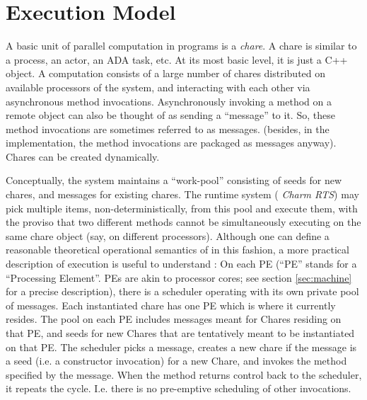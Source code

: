 \section{Execution Model}

A basic
unit of parallel computation in \charm programs is a {\em
chare}. 
A chare is similar to a process, an actor, an ADA task,
etc. At its most basic level, it is just a C++ object.
A \charm computation consists of a large number of chares
distributed on available processors of the system, and interacting
with each other via asynchronous method invocations.
Asynchronously invoking a method on a remote object can also be
thought of as
sending a ``message'' to it. So, these method invocations are
sometimes referred to as messages. (besides, in the implementation,
the method invocations are packaged as messages anyway).
Chares can be
created dynamically.

Conceptually, the system maintains a
``work-pool'' consisting of seeds for new chares, and
messages for existing chares. The \charm runtime system ({\em
Charm RTS}) may pick multiple items, non-deterministically, from this
pool and execute them, with the proviso that two different methods
cannot be simultaneously executing on the same chare object (say, on
different processors). Although one can define a reasonable
theoretical operational semantics of \charm in this fashion, a more
practical description of execution is useful to understand \charm: On
each PE (``PE'' stands for a ``Processing Element''. PEs are akin to
processor cores; see section \ref{sec:machine} for a precise
description), there is a scheduler operating with its own private pool
of messages. Each instantiated chare has one PE which is where it
currently resides. The pool on each PE includes messages meant for
Chares residing on that PE, and seeds for new Chares that are
tentatively meant to be instantiated on that PE. The scheduler picks a
message, creates a new chare if the message is a seed (i.e. a
constructor invocation) for a new Chare, and invokes the method
specified by the message. When the method returns control back to the
scheduler, it repeats the cycle. I.e. there is no pre-emptive
scheduling of other invocations.

